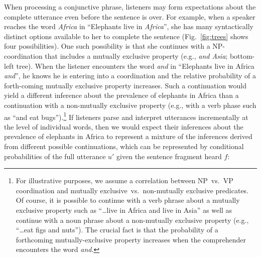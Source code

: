 \documentclass[10pt,letterpaper]{article}
\begin{document}
When processing a conjunctive phrase, listeners may form expectations about the complete utterance even before the sentence is over. 
For example, when a speaker reaches the word \emph{Africa} in ``Elephants live in \emph{Africa}'', she has many syntactically distinct options available to her to complete the sentence (Fig.~\ref{fig:trees} shows four possibilities).
One such possibility is that she continues with a NP-coordination that includes a mutually exclusive property (e.g., \emph{and Asia}; bottom-left tree). 
When the listener encounters the word \emph{and} in ``Elephants live in Africa \emph{and}'', he knows he is entering into a coordination and the relative probability of a forth-coming mutually exclusive property increases.
Such a continuation would yield a different inference about the prevalence of elephants in Africa than a continuation with a non-mutually exclusive property (e.g., with a verb phase such as ``and eat bugs'').\footnote{
	For illustrative purposes, we assume a correlation between NP~vs.~VP coordination and mutually exclusive~vs.~non-mutually exclusive predicates. Of course, it is possible to continue with a verb phrase about a mutually exclusive property such as ``\ldots live in Africa and live in Asia'' as well as continue with a noun phrase about a non-mutually exclusive property (e.g., ``\ldots eat figs and nuts''). The crucial fact is that the probability of a forthcoming mutually-exclusive property increases when the comprehender encounters the word \emph{and}. 
}
If listeners parse and interpret utterances incrementally at the level of individual words, then we would expect their inferences about the prevalence of elephants in Africa to represent a mixture of the inferences derived from different possible continuations, which can be represented by conditional probabilities of the full utterance $u'$ given the sentence fragment heard $f$:
\end{document}
